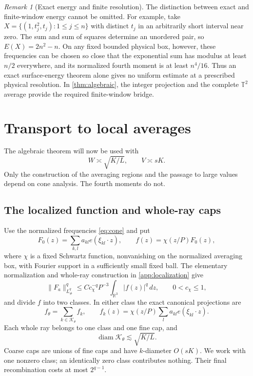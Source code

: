 \documentclass[11pt,reqno]{amsart}
\numberwithin{equation}{section}
\theoremstyle{definition}
\theoremstyle{remark}
\newtheorem{remark}[remark]{Remark}
\newcommand{\R}{\mathbb R}
\newcommand{\T}{\mathbb T}
\newcommand{\diam}{\operatorname{diam}}
\begin{document}
\begin{remark}[Exact energy and finite resolution]\label{rem:resolution}
The distinction between exact and finite-window energy cannot be omitted.
For example, take $X=\{(1,t_j^2,t_j):1\le j\le n\}$ with distinct $t_j$ in an arbitrarily
short interval near zero. The sum and sum of squares determine an unordered pair,
so $E(X)=2n^2-n$.
On any fixed bounded physical box, however, these frequencies can be chosen so close
that the exponential sum has modulus at least $n/2$ everywhere, and its normalized
fourth moment is at least $n^4/16$.
Thus an exact surface-energy theorem alone gives no uniform estimate at a prescribed
physical resolution. In \cref{thm:algebraic}, the integer projection and the complete
$\T^2$ average provide the required finite-window bridge.
\end{remark}

\section{Transport to local averages}\label{sec:transfer}\label{sec:local}
The algebraic theorem will now be used with
\begin{equation}\label{eq:widthchoice}
 W\asymp\sqrt{K/L},\qquad V\asymp sK.
\end{equation}
Only the construction of the averaging regions and the passage to large values depend on
cone analysis. The fourth moments do not.

\subsection{The localized function and whole-ray caps}
Use the normalized frequencies \eqref{eq:cone} and put
\begin{equation}\label{eq:localized}
 F_0(z)=\sum_{k,l}a_{kl}e(\xi_{kl}\cdot z),\qquad
 f(z)=\chi(z/P)F_0(z),
\end{equation}
where $\chi$ is a fixed Schwartz function, nonvanishing on the normalized averaging box,
with Fourier support in a sufficiently small fixed ball.
The elementary normalization and whole-ray construction in
\cref{app:localization} give
\begin{equation}\label{eq:normlocalization}
 \|F_a\|_{L^q_\#}^q\le Cc_\chi^{-q}P^{-3}\int_{\R^3}|f(z)|^q\,dz,
 \qquad 0<c_\chi\le1,
\end{equation}
and divide $f$ into two classes. In either class the exact canonical projections are
\begin{equation}\label{eq:canonicalprojection}
 f_\theta=\sum_{k\in\mathcal K_\theta}f_k,
 \qquad f_k(z)=\chi(z/P)\sum_l a_{kl}e(\xi_{kl}\cdot z).
\end{equation}
Each whole ray belongs to one class and one fine cap, and
\begin{equation}\label{eq:canonicalwidth}
 \diam\mathcal K_\theta\lesssim\sqrt{K/L}.
\end{equation}
Coarse caps are unions of fine caps and have $k$-diameter $O(sK)$.
We work with one nonzero class; an identically zero class contributes nothing.
Their final recombination costs at most $2^{q-1}$.
\end{document}
